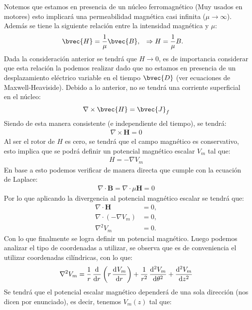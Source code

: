 \documentclass[
  11pt,
  letterpaper,
   answers
  ]{exam}
\begin{document}
\begin{questions}
\begin{solution}
\begin{parts}
  Notemos que estamos en presencia de un núcleo ferromagnético (Muy usados en motores) esto implicará una permeabilidad magnética casi infinita ($\mu \rightarrow \infty$). Además se tiene la siguiente relación entre la intensidad magnética y $\mu$: 
  \begin{align}
    \bvec{H} &= \frac{1}{\mu} \bvec{B}, &\Rightarrow {H} &= \frac{1}{\mu} {B}.
  \end{align}
  Dada la consideración anterior se tendrá que $H \rightarrow 0$, es de importancia considerar que esta relación la podemos realizar dado que no estamos en presencia de un desplazamiento eléctrico variable en el tiempo $\bvec{D}$ (ver ecuaciones de Maxwell-Heaviside). Debido a lo anterior, no se tendrá una corriente superficial en el núcleo: 
  \begin{align}
    \nabla \times \bvec{H} = \bvec{J}_f  
  \end{align}
  Siendo de esta manera consistente (e independiente del tiempo), se tendrá: 
  \begin{align}
    \nabla \times \mathbf{H} = 0  
  \end{align}
  Al ser el rotor de $H$ es cero, se tendrá que el campo magnético es conservativo, esto implica que se podrá definir un potencial magnético escalar $V_{m}$ tal que:
  \begin{align}
    H = -\nabla V_{m} 
  \end{align}
  En base a esto podemos verificar de manera directa que cumple con la ecuación de Laplace:
  \begin{align}
    \nabla \cdot \mathbf{B} = \nabla \cdot \mu \mathbf{H}= 0 
  \end{align}
  Por lo que aplicando la divergencia al potencial magnético escalar se tendrá que:
  \begin{align}
    \nabla \cdot \mathbf{H} &= 0,\\
    \nabla \cdot (-\nabla V_{m}) &= 0,\\
    \nabla^{2} V_{m} &= 0.
  \end{align}
  Con lo que finalmente se logra definir un potencial magnético. Luego podemos analizar el tipo de coordenadas a utilizar, se observa que es de conveniencia el utilizar coordenadas cilíndricas, con lo que:
  \begin{align}
    \nabla^{2}V_{m} = \frac{1}{r} \dod{}{r}\del{r \dod{V_m}{r}} + \frac{1}{r^{2}}\dod[2]{V_m}{\theta} + \dod[2]{V_m}{z}
  \end{align}
  Se tendrá que el potencial escalar magnético dependerá de una sola dirección (nos dicen por enunciado), es decir, tenemos $V_{m}(z)$ tal que:

\end{parts}
\end{solution}
\end{questions}
\end{document}
